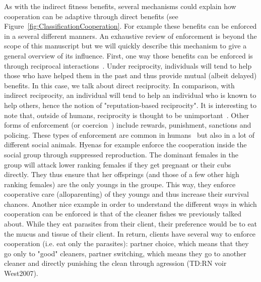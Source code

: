     As with the indirect fitness benefits, several mechanisms could explain how cooperation can be adaptive through direct benefits (see Figure~\ref{fig:ClassificationCooperation}. For example these benefits can be enforced in a several different manners. An exhaustive review of enforcement is beyond the scope of this manuscript but we will quickly describe this mechanism to give a general overview of its influence. First, one way those benefits can be enforced is through reciprocal interactions~\parencite{Trivers1971}. Under reciprocity, individuals will tend to help those who have helped them in the past and thus provide mutual (albeit delayed) benefits. In this case, we talk about direct reciprocity. In comparison, with indirect reciprocity, an individual will tend to help an individual who is known to help others, hence the notion of "reputation-based reciprocity". It is interesting to note that, outside of humans, reciprocity is thought to be unimportant~\parencite{Dugatkin1997}. Other forms of enforcement (or coercion~\parencite{Clutton-Brock2002}) include rewards, punishment, sanctions and policing. These types of enforcement are common in humans~\parencite{Fehr2002} but also in a lot of different social animals. Hyenas for example enforce the cooperation inside the social group through suppressed reproduction. The dominant females in the group will attack lower ranking females if they get pregnant or their cubs directly. They thus ensure that her offsprings (and those of a few other high ranking females) are the only youngs in the groupe. This way, they enforce cooperative care (alloparenting) of they youngs and thus increase their survival chances. Another nice example in order to understand the different ways in which cooperation can be enforced is that of the cleaner fishes we previously talked about. While they eat parasites from their client, their preference would be to eat the mucus and tissue of their client. In return, clients have several way to enforce cooperation (i.e. eat only the parasites): partner choice, which means that they go only to "good" cleaners, partner switching, which means they go to another cleaner and directly punishing the clean through agression (TD:RN voir West2007).


